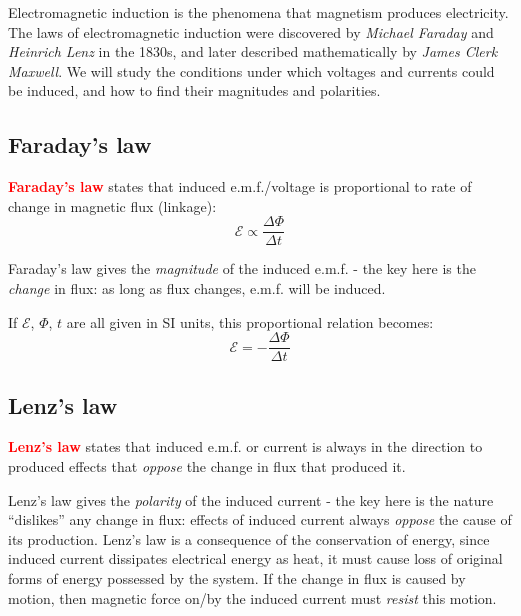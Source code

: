 \documentclass[a4paper,12pt]{book}
\newcommand{\cmt}{}
\newenvironment{ilight}
  {\centering
  	\vspace*{6pt}
  	\begin{tcolorbox}[colframe=Gray,colback=LightGrey!15]
  \setlength{\baselineskip}{\baselineskip}%
  }
  {\end{tcolorbox}\vspace*{-4pt}}
\newcommand{\keypoint}[1]{\textbf{\textcolor{red}{#1}}}
\newcommand{\rcyskip}{\vspace{4pt}}
\newcommand{\tcbhighmath}[1]{\boxed{#1}}
\newcommand{\keypoint}[1]{\textbf{\textcolor{red}{#1}}}
\newcommand{\cmt}{}
\begin{document}
Electromagnetic induction is the phenomena that magnetism produces electricity. The laws of electromagnetic induction were discovered by \emph{Michael Faraday} and \emph{Heinrich Lenz} in the 1830s, and later described mathematically by \emph{James Clerk Maxwell}. We will study the conditions under which voltages and currents could be induced, and how to find their magnitudes and polarities.

\subsection{Faraday's law}

\rcyskip

\begin{ilight}
	\keypoint{Faraday's law} states that induced e.m.f./voltage is proportional to rate of change in magnetic flux (linkage): $$\tcbhighmath{\mathcal{E} \propto \frac{\Delta \Phi}{\Delta t}}$$
\end{ilight}

\cmt Faraday's law gives the \emph{magnitude} of the induced e.m.f. - the key here is the \emph{change} in flux: as long as flux changes, e.m.f. will be induced.

If $\mathcal{E}$, $\Phi$, $t$ are all given in SI units, this proportional relation becomes: $$\tcbhighmath{\mathcal{E} = -\frac{\Delta \Phi}{\Delta t}}$$

\subsection{Lenz's law}

\rcyskip

\begin{ilight}
	\keypoint{Lenz's law} states that induced e.m.f. or current is always in the direction to produced effects that \emph{oppose} the change in flux that produced it.
\end{ilight}

\cmt Lenz's law gives the \emph{polarity} of the induced current - the key here is the nature ``dislikes'' any change in flux: effects of induced current always \emph{oppose} the cause of its production. Lenz's law is a consequence of the conservation of energy, since induced current dissipates electrical energy as heat, it must cause loss of original forms of energy possessed by the system. If the change in flux is caused by motion, then magnetic force on/by the induced current must \emph{resist} this motion.
\end{document}
